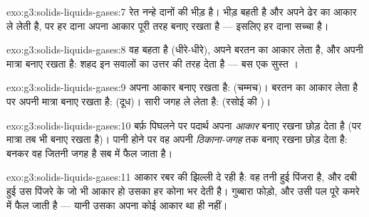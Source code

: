 \begin{solution}{exo:g3:solids-liquids-gases:7}
रेत नन्हे  दानों की भीड़ है। भीड़ बहती है और अपने ढेर का आकार ले
लेती है, पर हर दाना अपना आकार पूरी तरह बनाए रखता है --- इसलिए हर
दाना सच्चा  है।
\end{solution}

\begin{solution}{exo:g3:solids-liquids-gases:8}
वह बहता है (धीरे-धीरे), अपने बरतन का आकार लेता है, और अपनी मात्रा
बनाए रखता है: शहद इन सवालों का उत्तर  की तरह देता है --- बस एक
सुस्त ।
\end{solution}

\begin{solution}{exo:g3:solids-liquids-gases:9}
अपना आकार बनाए रखता है:  (चम्मच)। बरतन का आकार लेता है पर अपनी
मात्रा बनाए रखता है:  (दूध)। सारी जगह ले लेता है:  (रसोई की
)।
\end{solution}

\begin{solution}{exo:g3:solids-liquids-gases:10}
बर्फ़ पिघलने पर पदार्थ अपना \emph{आकार} बनाए रखना छोड़ देता है (पर
मात्रा तब भी बनाए रखता है)। पानी  होने पर वह अपनी
\emph{ठिकाना-जगह} तक बनाए रखना छोड़ देता है:  बनकर वह जितनी जगह है
सब में फैल जाता है।
\end{solution}

\begin{solution}{exo:g3:solids-liquids-gases:11}
आकार रबर की झिल्ली दे रही है: वह तनी हुई  पिंजरा है, और दबी हुई
 उस पिंजरे के जो भी आकार हो उसका हर कोना भर देती है। गुब्बारा
फोड़ो, और  उसी पल पूरे कमरे में फैल जाती है --- यानी उसका अपना कोई
आकार था ही नहीं।
\end{solution}
